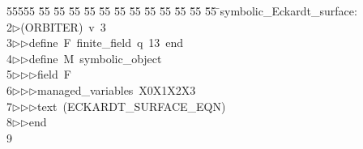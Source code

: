 %
%
\begin{tabbing}
55555 \= 55 \= 55 \= 55 \= 55 \= 55 \= 55 \= 55 \= 55 \= 55 \= 55 \= 55 \= 55 \= \>symbolic\_Eckardt\_surface:\\[0pt]
2\>$\triangleright$\>(ORBITER)\ v\ 3\ \\[0pt]
3\>$\triangleright$\>$\triangleright$\>define\ F\ finite\_field\ q\ 13\ end\ \\[0pt]
4\>$\triangleright$\>$\triangleright$\>define\ M\ symbolic\_object\ \\[0pt]
5\>$\triangleright$\>$\triangleright$\>$\triangleright$\>field\ F\ \\[0pt]
6\>$\triangleright$\>$\triangleright$\>$\triangleright$\>managed\_variables\ X0X1X2X3\ \\[0pt]
7\>$\triangleright$\>$\triangleright$\>$\triangleright$\>text\ (ECKARDT\_SURFACE\_EQN)\ \\[0pt]
8\>$\triangleright$\>$\triangleright$\>end\\[0pt]
9\>\end{tabbing}
